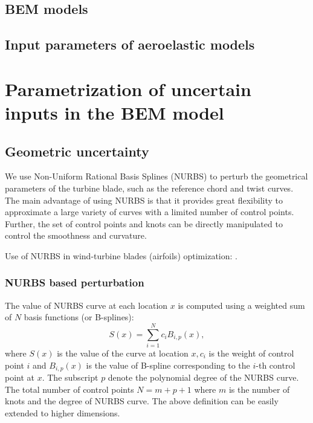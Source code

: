 \documentclass[review]{elsarticle}
\numberwithin{equation}{section}
\numberwithin{equation}{section}
\begin{document}
\subsection{BEM models}
\subsection{Input parameters of aeroelastic models}

\section{Parametrization of uncertain inputs in the BEM model}\label{sec:parameterization}

\subsection{Geometric uncertainty}
We use Non-Uniform Rational Basis Splines (NURBS) \cite{rogers2000} to perturb the geometrical parameters of the turbine blade, such as the reference chord and twist curves. The main advantage of using NURBS is that it provides great flexibility to approximate a large variety of curves with a limited number of control points. Further, the set of control points and knots can be directly manipulated to control the smoothness and curvature.

Use of NURBS in wind-turbine blades (airfoils) optimization: \cite{Ribeiro2012,Bottasso2014}.

\subsubsection{NURBS based perturbation}
The value of NURBS curve at each location $x$ is computed using a weighted sum of $N$ basis functions (or B-splines):
\begin{equation}\label{NURB_curve}
S(x)  = \sum_{i=1}^{N} c_i B_{i,p}(x),
\end{equation}
where $S(x)$ is the value of the curve at location $x, c_i$ is the weight of control point $i$ and $B_{i,p}(x)$ is the value of B-spline corresponding to the $i$-th control point at $x$. The subscript $p$ denote the polynomial degree of the NURBS curve. The total number of control points $N = m+p+1$ where $m$ is the number of knots  and the degree of NURBS curve. The above definition can be easily extended to higher dimensions. 
\end{document}
